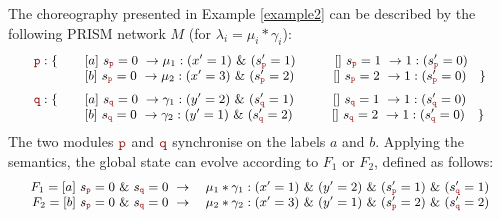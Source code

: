 \begin{exa}\label{example3}
  The choreography presented in Example \ref{example2} can be
  described by the following PRISM network $M$ (for
  $\lambda_i=\mu_i*\gamma_i$):
\begin{displaymath}\small
  \begin{array}{llll}
    \role{p}: \{ & \quad \commandBase {a}{s_{\role p}=0} {\mu_1:(x'=1)
                   \ \&\ (s_{\role p}'=1)} 
                   \quad\qquad \commandBase {}{s_{\role p}=1} 
                   {1:(s_{\role p}'=0) }\\
                 & \quad \commandBase {b}{s_{\role p}=0} {\mu_2:(x'=3)
                   \ \&\ (s_{\role p}'=2)}
                   \quad\qquad \commandBase {}{s_{\role p}=2} 
                   {1:(s_{\role p}'=0) }\quad \}\\[2mm]
    \role{q}: \{ & \quad \commandBase {a}{s_{\role q}=0} {\gamma_1:(y'=2)
                   \ \&\ (s_{\role q}'=1) } 
                   \qquad\quad \commandBase {}{s_{\role q}=1} 
                   {1:(s_{\role q}'=0) }\\
                 & \quad \commandBase {b}{s_{\role q}=0} {\gamma_2:(y'=1)
                   \ \&\ (s_{\role q}'=2) } 
                   \qquad\quad \commandBase {}{s_{\role q}=2} 
                   {1:(s_{\role q}'=0) }\quad \}\\
  \end{array}
\end{displaymath}
The two modules $\role p$ and $\role q$ synchronise on the labels $a$
and $b$.  Applying the semantics, the global state can evolve
according to $F_1$ or $F_2$, defined as follows:
\begin{displaymath}\small
  \begin{array}{rlll}
    F_1=\commandBase {a}{s_{\role p}=0\ \&\ s_{\role q}=0} {\quad} \mu_1*\gamma_1 : 
    (x'=1) \ \&\ (y'=2) \ \&\ (s_{\role p}'=1) \ \&\ (s_{\role q}'=1) \\
    F_2=\commandBase {b}{s_{\role p}=0\ \&\ s_{\role q}=0} {\quad} \mu_2*\gamma_2 : 
    (x'=3) \ \&\ (y'=1) \ \&\  (s_{\role p}'=2) \ \&\ (s_{\role q}'=2)\\

  \end{array}
\end{displaymath} 

\end{exa}


